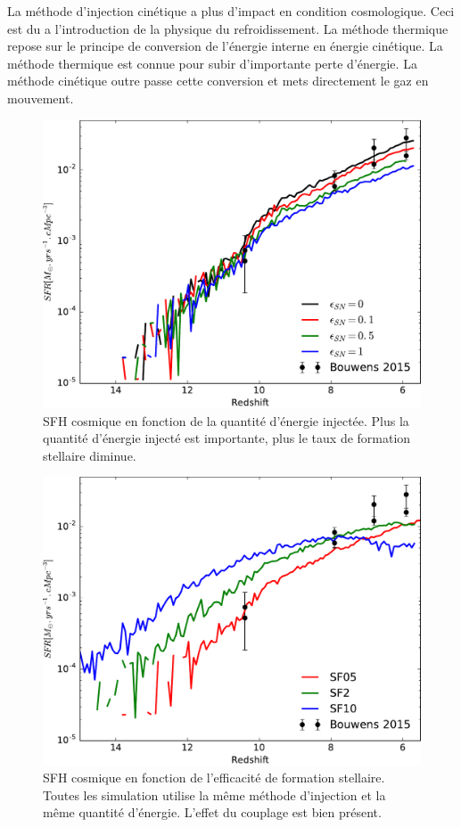 La méthode d'injection cinétique a plus d'impact en condition cosmologique.
Ceci est du a l'introduction de la physique du refroidissement.
La méthode thermique repose sur le principe de conversion de l'énergie interne en énergie cinétique.
La méthode thermique est connue %
pour subir d'importante perte d'énergie.
La méthode cinétique outre passe cette conversion et mets directement le gaz en mouvement.


\begin{figure}[bth]
        \includegraphics[width=.95\textwidth]{img/03/sedov/sneff_SFR.pdf} 
        \caption{SFH cosmique en fonction de la quantité d'énergie injectée. 
        Plus la quantité d'énergie injecté est importante, plus le taux de formation stellaire diminue.
        }
 		\label{fig:sfr_methode}
\end{figure}


\begin{figure}[bth]
        \includegraphics[width=.95\textwidth]{img/03/sedov/SFR_sfeff.pdf} 
        \caption{SFH cosmique en fonction de l'efficacité de formation stellaire.
        Toutes les simulation utilise la même méthode d'injection et la même quantité d'énergie.
		L'effet du couplage est bien présent.
        }
 		\label{fig:sfr_methode}
\end{figure}


